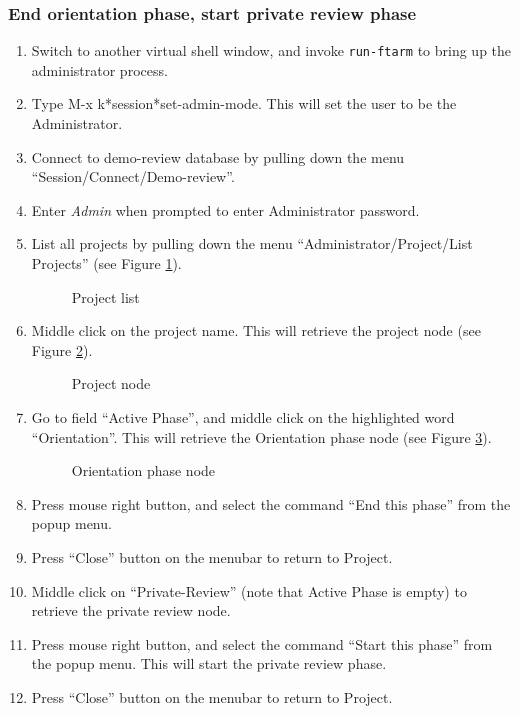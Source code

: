 \subsubsection{End orientation phase, start private review phase}
\begin{enumerate}
\item Switch to another virtual shell window, and
invoke {\tt run-ftarm} to bring up the administrator process.
\item Type M-x k*session*set-admin-mode. This will set the user to be
the Administrator.
\item Connect to demo-review database by pulling down the menu
``Session/Connect/Demo-review''.
\item Enter {\it Admin} when prompted to enter Administrator password.
\item List all projects by pulling down the menu
``Administrator/Project/List Projects'' (see Figure \ref{project-list}).
\begin{figure}[htb]
  {\centerline{}}
  \caption{Project list}
  \label{project-list}
\end{figure}

\item Middle click on the project name. This will retrieve the project
node (see Figure \ref{project-node}).
\begin{figure}[htb]
  {\centerline{}}
  \caption{Project node}
  \label{project-node}
\end{figure}

\item Go to field ``Active Phase'', and middle click on the
highlighted word ``Orientation''. This will retrieve the Orientation
phase node (see Figure \ref{orientation-phase-node}).
\begin{figure}[htb]
  {\centerline{}}
  \caption{Orientation phase node}
  \label{orientation-phase-node}
\end{figure}

\item Press mouse right button, and select the command ``End this
phase'' from the popup menu.
\item Press ``Close'' button on the menubar to return to Project.
\item Middle click on ``Private-Review'' (note that Active Phase is
empty) to retrieve the private review node.
\item Press mouse right button, and select the command ``Start this
phase'' from the popup menu. This will start the private review phase.
\item Press ``Close'' button on the menubar to return to Project.
\end{enumerate}


